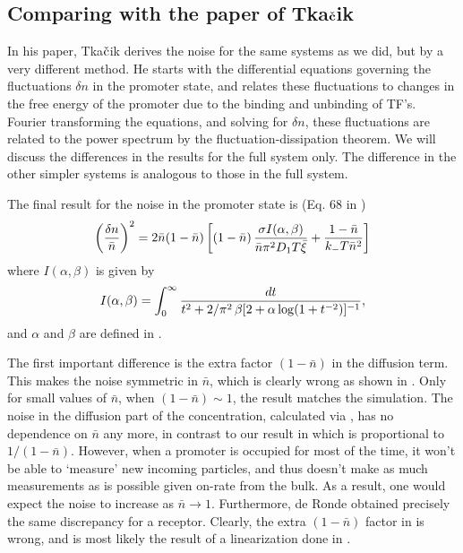 \subsection{Comparing with the paper of Tka$\check{\bf c}$ik}
In his paper, Tka$\check{\rm c}$ik derives the noise for the same systems as we did, but by a very different method. He starts with the differential equations governing the fluctuations $\delta n$ in the promoter state, and relates these fluctuations to changes in the free energy of the promoter due to the binding and unbinding of TF's. Fourier transforming the equations, and solving for $\delta n$, these fluctuations are related to the power spectrum by the fluctuation-dissipation theorem. We will discuss the differences in the results for the full system only. The difference in the other simpler systems is analogous to those in the full system. 

The final result for the noise in the promoter state is (Eq. 68 in \cite{Tkacik2009}) 
\begin{equation}
 \elabel{NoiseProTka}
 \left( \frac{\delta n}{\bar{n}} \right)^2 = 2 \bar{n}(1-\bar{n})\left[ (1 -\bar{n}) \, \frac{\sigma I(\alpha,\beta)}{\bar{n} \pi^2 D_1 T \bar{\xi}} + \frac{1-\bar{n}}{k_- T \bar{n}^2} \right]
\end{equation}
where $I(\alpha,\beta)$ is given by
\begin{equation}
 \elabel{IntProTka}
 I(\alpha,\beta) = \int_0^{\infty} \frac{dt}{t^2 + 2/\pi^{2} \, \beta[2 + \alpha \, {\rm log}(1 + t^{-2})]^{-1}},
\end{equation}
and $\alpha$ and $\beta$ are defined in . 

The first important difference is the extra factor $(1-\bar{n})$ in the diffusion term. This makes the noise symmetric in $\bar{n}$, which is clearly wrong as shown in . Only for small values of $\bar{n}$, when $(1-\bar{n})\sim 1$, the result matches the simulation. The noise in the diffusion part of the concentration, calculated via , has no dependence on $\bar{n}$ any more, in contrast to our result in  which is proportional to $1/(1-\bar{n})$. However, when a promoter is occupied for most of the time, it won't be able to `measure' new incoming particles, and thus doesn't make as much measurements as is possible given on-rate from the bulk. As a result, one would expect the noise to increase as $\bar{n}\to1$. Furthermore, de Ronde \cite{DeRonde2012} obtained precisely the same discrepancy for a receptor. Clearly, the extra $(1-\bar{n})$ factor in  is wrong, and is most likely the result of a linearization done in \cite{Tkacik2009}. 

